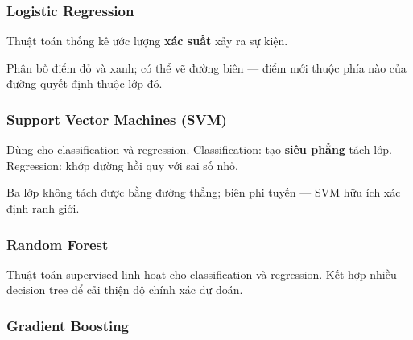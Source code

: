 \subsubsection{Logistic Regression}

\begin{ynghia}[title={Hồi quy logistic}]
Thuật toán thống kê ước lượng \textbf{xác suất} xảy ra sự kiện.
\end{ynghia}

\begin{vidu}[title={Phân tách lớp bằng đường biên}]
Phân bố điểm đỏ và xanh; có thể vẽ đường biên --- điểm mới thuộc phía nào của đường quyết định thuộc lớp đó.
\end{vidu}

\subsubsection{Support Vector Machines (SVM)}

\begin{ynghia}[title={SVM}]
Dùng cho classification và regression.
Classification: tạo \textbf{siêu phẳng} tách lớp.
Regression: khớp đường hồi quy với sai số nhỏ.
\end{ynghia}

\begin{vidu}[title={Dữ liệu không tách tuyến tính}]
Ba lớp không tách được bằng đường thẳng; biên phi tuyến --- SVM hữu ích xác định ranh giới.
\end{vidu}

\subsubsection{Random Forest}

\begin{ynghia}[title={Random Forest}]
Thuật toán supervised linh hoạt cho classification và regression.
Kết hợp nhiều decision tree để cải thiện độ chính xác dự đoán.
\end{ynghia}

\begin{vidu}[title={Cách Random Forest hoạt động}]
\end{vidu}

\subsubsection{Gradient Boosting}

